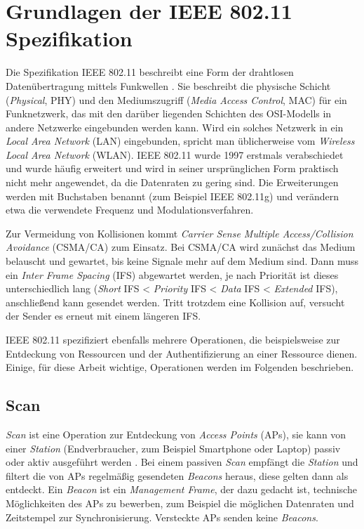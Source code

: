 \section{Grundlagen der IEEE 802.11 Spezifikation}
\label{ch:phase1:sec:grundlagen}
Die Spezifikation IEEE 802.11 beschreibt eine Form der drahtlosen Datenübertragung mittels Funkwellen \cite{ieee2012macphy}.
Sie beschreibt die physische Schicht (\emph{Physical}, PHY) und den Mediumszugriff (\emph{Media Access Control}, MAC) für ein Funknetzwerk, das mit den darüber liegenden Schichten des OSI-Modells in andere Netzwerke eingebunden werden kann.
Wird ein solches Netzwerk in ein \emph{Local Area Network} (LAN) eingebunden, spricht man üblicherweise vom \emph{Wireless Local Area Network} (WLAN).
IEEE 802.11 wurde 1997 erstmals verabschiedet und wurde häufig erweitert und wird in seiner ursprünglichen Form praktisch nicht mehr angewendet, da die Datenraten zu gering sind.
Die Erweiterungen werden mit Buchstaben benannt (zum Beispiel IEEE 802.11g) und verändern etwa die verwendete Frequenz und Modulationsverfahren.

Zur Vermeidung von Kollisionen kommt \emph{Carrier Sense Multiple Access/Collision Avoidance} (CSMA/CA) zum Einsatz.
Bei CSMA/CA wird zunächst das Medium belauscht und gewartet, bis keine Signale mehr auf dem Medium sind. 
Dann muss ein \emph{Inter Frame Spacing} (IFS) abgewartet werden, je nach Priorität ist dieses unterschiedlich lang (\emph{Short} IFS < \emph{Priority} IFS < \emph{Data} IFS < \emph{Extended} IFS), anschließend kann gesendet werden.
Tritt trotzdem eine Kollision auf, versucht der Sender es erneut mit einem längeren IFS.

IEEE 802.11 spezifiziert ebenfalls mehrere Operationen, die beispielsweise zur Entdeckung von Ressourcen und der Authentifizierung an einer Ressource dienen.
Einige, für diese Arbeit wichtige, Operationen werden im Folgenden beschrieben.

\subsection{Scan}
\label{ch:phase1:sec:scan}
\emph{Scan} ist eine Operation zur Entdeckung von \emph{Access Points} (APs), sie kann von einer \emph{Station} (Endverbraucher, zum Beispiel Smartphone oder Laptop) passiv oder aktiv ausgeführt werden \cite{ieee2012scan}.
Bei einem passiven \emph{Scan} empfängt die \emph{Station} und filtert die von APs regelmäßig gesendeten \emph{Beacons} heraus, diese gelten dann als entdeckt.
Ein \emph{Beacon} ist ein \emph{Management Frame}, der dazu gedacht ist, technische Möglichkeiten des APs zu bewerben, zum Beispiel die möglichen Datenraten und Zeitstempel zur Synchronisierung.
Versteckte APs senden keine \emph{Beacons}. 

